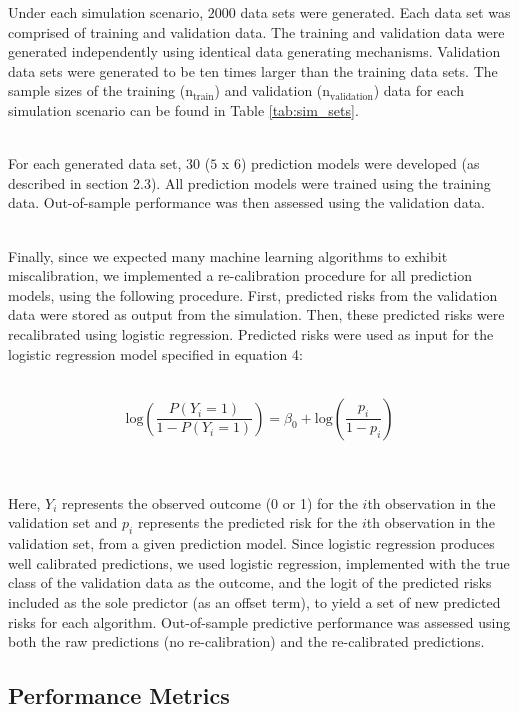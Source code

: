 \documentclass[AMA,STIX1COL,]{WileyNJD-v2}
\begin{document}
\hfill\break
Under each simulation scenario, \(2000\) data sets were generated. Each
data set was comprised of training and validation data. The training and
validation data were generated independently using identical data
generating mechanisms. Validation data sets were generated to be ten
times larger than the training data sets. The sample sizes of the
training (\(\mathrm{n}_{\mathrm{train}}\)) and validation
(\(\mathrm{n}_{\mathrm{validation}}\)) data for each simulation scenario
can be found in Table \ref{tab:sim_sets}.\\
\strut \\
For each generated data set, 30 (\(5\) x \(6\)) prediction models were
developed (as described in section 2.3). All prediction models were
trained using the training data. Out-of-sample performance was then
assessed using the validation data.\\
\strut \\
Finally, since we expected many machine learning algorithms to exhibit
miscalibration, we implemented a re-calibration procedure for all
prediction models, using the following procedure. First, predicted risks
from the validation data were stored as output from the simulation.
Then, these predicted risks were recalibrated using logistic regression.
Predicted risks were used as input for the logistic regression model
specified in equation 4:\\
\strut \\
\begin{equation}
\mathrm{log} \left( \frac{P(Y_i = 1)}{1- P(Y_i = 1)} \right) = \beta_0 + \mathrm{log} \left( \frac{p_i}{1-p_i} \right)
\end{equation}\\
\strut \\
Here, \(Y_i\) represents the observed outcome (0 or 1) for the \(i\)th
observation in the validation set and \(p_i\) represents the predicted
risk for the \(i\)th observation in the validation set, from a given
prediction model. Since logistic regression produces well calibrated
predictions, we used logistic regression, implemented with the true
class of the validation data as the outcome, and the logit of the
predicted risks included as the sole predictor (as an offset term), to
yield a set of new predicted risks for each algorithm. Out-of-sample
predictive performance was assessed using both the raw predictions (no
re-calibration) and the re-calibrated predictions.

\hypertarget{performance-metrics}{%
\subsection{Performance Metrics}\label{performance-metrics}}
\end{document}
